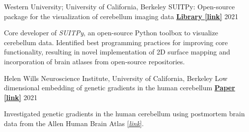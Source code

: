 
\begin{cventries}
    
  \cventry
  	{Western University; University of California, Berkeley}
  	{SUITPy: Open-source package for the visualization of cerebellum imaging data} %
  	{\href{https://suitpy.readthedocs.io/en/latest/}{\textbf{Library [link]}}}
  	{2021} %
    {
      \begin{cvitems} %
      	\item {Core developer of \textit{SUITPy}, an open-source Python toolbox to visualize cerebellum data. Identified best programming practices for improving core functionality, resulting in novel implementation of 2D surface mapping and incorporation of brain atlases from open-source repositories.}
      \end{cvitems}
    }
    
  \cventry
  	{Helen Wills Neuroscience Institute, University of California, Berkeley}
    {Low dimensional embedding of genetic gradients in the human cerebellum} %
    {\href{https://papers.ssrn.com/sol3/papers.cfm?abstract_id=3797269}{\textbf{Paper [link]}}}
    {2021} %
    {
      \begin{cvitems} %
      	\item {Investigated genetic gradients in the human cerebellum using postmortem brain data from the Allen Human Brain Atlas \href{https://human.brain-map.org/}{[\textit{link}}].} 			
      \end{cvitems}
    }
    

\end{cventries}
